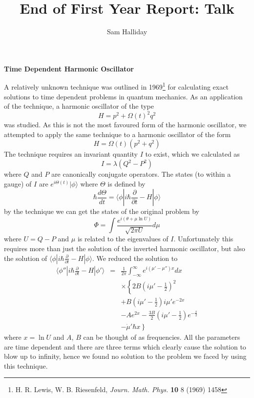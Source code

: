 \documentclass[14pt, a4paper, titlepage]{slides}
\begin{document}
\title{End of First Year Report: Talk}
\author{Sam Halliday}
\maketitle

\textbf{Time Dependent Harmonic Oscillator}

A relatively unknown technique was outlined in 1969\footnote{H. R. Lewis, W.  B.
  Riesenfeld, {\it Journ. Math. Phys.} {\bf 10} 8 (1969) 1458} for calculating
exact solutions to time dependent problems in quantum mechanics. As an
application of the technique, a harmonic oscillator of the type
\begin{equation*}
  H=p^2+\Omega(t)^2q^2
\end{equation*}
was studied. As this is not the most favoured form of the harmonic oscillator,
we attempted to apply the same technique to a harmonic oscillator of the form
\begin{equation*}
  H=\Omega(t)\left(p^2+q^2\right)
\end{equation*}
The technique requires an invariant quantity $I$ to exist, which we calculated
as
\begin{equation*}
  I=\lambda\left(Q^2-P^2\right)  
\end{equation*}
where $Q$ and $P$ are canonically conjugate operators. The states (to within a
gauge) of $I$ are $e^{i\Theta(t)}|\phi\rangle$ where $\Theta$ is defined by
\begin{equation*}
  \hbar \frac{d\Theta}{dt}  =\langle\phi|i\hbar \frac{\partial}{\partial t}
  -H|\phi\rangle
\end{equation*}
by the technique we can get the states of the original problem by
\begin{equation*}
  \Phi=\int \frac{e^{i\left(\theta + \mu \ln{U}\right)}}{\sqrt{2\pi U}}d\mu
\end{equation*}
where $U=Q-P$ and $\mu$ is related to the eigenvalues of $I$. Unfortunately
this requires more than just the solution of the inverted harmonic oscillator,
but also the solution of $\langle\phi|i\hbar\frac{\partial}{\partial t}
-H|\phi\rangle$. We reduced the solution to
\begin{eqnarray*}
  \langle \phi''|i\hbar \frac{\partial }{\partial t} - H|\phi' \rangle &=& \frac{1}{2\pi}
  \int^\infty_{-\infty} e^{i\left(\mu' - \mu'' \right) x}dx \\
  &&\times\left\{2B \left( i\mu' - \frac{1}{2}\right)^2\right.\nonumber\\
  &&+ B \left( i\mu'-\frac{1}{2}\right) i \mu' e^{-2x} \nonumber\\
  &&- Ae^{2x} - \frac{3B}{2} \left( i\mu'-\frac{1}{2}\right) e^{-\frac{x}{2}}\nonumber\\
  &&\left.- \dot{\mu}' \hbar x \right\}\nonumber
\end{eqnarray*}
where $x=\ln{U}$ and $A$, $B$ can be thought of as frequencies. All the
parameters are time dependent and there are three terms which clearly cause the
solution to blow up to infinity, hence we found no solution to the problem we
faced by using this technique.
\end{document}
